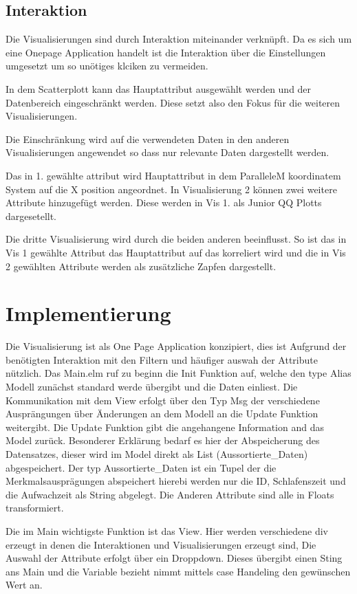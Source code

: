 \documentclass[usegeometry=true]{scrartcl}
\begin{document}
\subsection{Interaktion}
Die Visualisierungen sind durch Interaktion miteinander verknüpft. Da es sich um eine Onepage Application handelt ist die 
Interaktion über die Einstellungen umgesetzt um so unötiges klciken zu vermeiden.

In dem Scatterplott kann das Hauptattribut ausgewählt werden und der Datenbereich eingeschränkt werden. 
Diese setzt also den Fokus für die weiteren Visualisierungen.

Die Einschränkung wird auf die verwendeten Daten in den anderen Visualisierungen angewendet so dass nur relevante Daten dargestellt werden.

Das in 1. gewählte attribut wird  Hauptattribut in dem ParalleleM koordinatem System auf die X position angeordnet.
In Visualisierung 2 können zwei weitere  Attribute hinzugefügt werden. Diese werden in Vis 1. als Junior QQ Plotts dargesetellt.

Die dritte Visualisierung wird durch die beiden anderen beeinflusst. So ist das in Vis 1 gewählte Attribut das Hauptattribut auf das korreliert wird und die in Vis 2 gewählten Attribute werden als zusätzliche Zapfen dargestellt.


\section{Implementierung}
Die Visualisierung ist als One Page Application konzipiert, dies ist Aufgrund der benötigten Interaktion mit den Filtern und häufiger auswah der Attribute nützlich.
Das Main.elm ruf zu beginn die Init Funktion auf, welche den type Alias Modell zunächst standard werde übergibt und die Daten einliest. 
Die Kommunikation mit dem View erfolgt über den Typ Msg der verschiedene Ausprängungen über Änderungen an dem Modell an die Update Funktion weitergibt. 
Die Update Funktion gibt die angehangene Information and das Model zurück.
Besonderer Erklärung bedarf es hier der Abspeicherung des Datensatzes, dieser wird im Model direkt als List (Aussortierte_Daten) abgespeichert.
Der typ Aussortierte_Daten ist ein Tupel der die Merkmalsausprägungen abspeichert hierebi werden nur die ID, Schlafenszeit und die Aufwachzeit als String abgelegt. Die Anderen Attribute sind alle in Floats transformiert.

Die im Main wichtigste Funktion ist das View. Hier werden verschiedene div erzeugt in denen die Interaktionen und Visualisierungen erzeugt sind,
Die Auswahl der Attribute erfolgt über ein Droppdown. Dieses übergibt einen Sting ans Main und die Variable bezieht nimmt mittels case Handeling den gewünschen Wert an.
\end{document}
